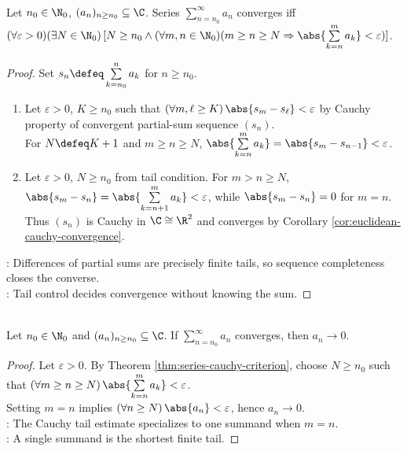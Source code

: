 \begin{theorem} \label{thm:series-cauchy-criterion} \\
Let $n_0\in\N_0$, $(a_n)_{n\geq n_0}\subseteq\C$. Series $\sum\limits_{n=n_0}^{\infty}a_n$ converges iff $(\forall\varepsilon>0)(\exists N\in\N_0)\,[N\geq n_0\land(\forall m,n\in\N_0)(m\geq n\geq N\Rightarrow\abs{\sum\limits_{k=n}^{m}a_k}<\varepsilon)]$.
\begin{proof}
Set $s_n\defeq\sum\limits_{k=n_0}^{n}a_k$ for $n\geq n_0$.
\begin{enumerate}[label=\roman*.]
\setlength{\itemsep}{0pt}
\item[$(\Rightarrow)$] Let $\varepsilon>0$, $K\geq n_0$ such that $(\forall m,\ell\geq K)\,\abs{s_m-s_\ell}<\varepsilon$ by Cauchy property of convergent partial-sum sequence $(s_n)$.\\
For $N\defeq K+1$ and $m\geq n\geq N$, $\abs{\sum\limits_{k=n}^{m}a_k}=\abs{s_m-s_{n-1}}<\varepsilon$.
\item[$(\Leftarrow)$] Let $\varepsilon>0$, $N\geq n_0$ from tail condition. For $m>n\geq N$, $\abs{s_m-s_n}=\abs{\sum\limits_{k=n+1}^{m}a_k}<\varepsilon$, while $\abs{s_m-s_n}=0$ for $m=n$.\\
Thus $(s_n)$ is Cauchy in $\C\cong\R^2$ and converges by Corollary \ref{cor:euclidean-cauchy-convergence}.
\end{enumerate}
: Differences of partial sums are precisely finite tails, so sequence completeness closes the converse.\\
: Tail control decides convergence without knowing the sum.
\end{proof}
\end{theorem}

\begin{corollary} \label{cor:series-terms-tend-to-zero} \\
Let $n_0\in\N_0$ and $(a_n)_{n\geq n_0}\subseteq\C$. If $\sum\limits_{n=n_0}^{\infty}a_n$ converges, then $a_n\to0$.
\begin{proof}
Let $\varepsilon>0$. By Theorem \ref{thm:series-cauchy-criterion}, choose $N\geq n_0$ such that $(\forall m\geq n\geq N)\,\abs{\sum\limits_{k=n}^{m}a_k}<\varepsilon$.\\
Setting $m=n$ implies $(\forall n\geq N)\,\abs{a_n}<\varepsilon$, hence $a_n\to0$.\\
: The Cauchy tail estimate specializes to one summand when $m=n$.\\
: A single summand is the shortest finite tail.
\end{proof}
\end{corollary}

